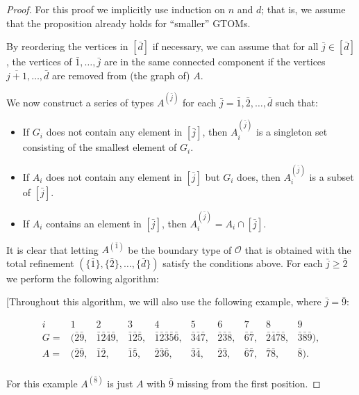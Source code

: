 \documentclass[letterpaper,reqno,11pt]{amsart}
\begin{document}
\begin{proof}
    For this proof we implicitly use induction on $n$ and $d$; that is, we assume that the proposition already holds for ``smaller'' GTOMs.

    By reordering the vertices in $[\bar{d}]$ if necessary, we can assume that for all $\bar{j}\in [\bar{d}]$, the vertices of $\bar{1}, \dots, \bar{j}$ are in the same connected component if the vertices $\overline{j+1}, \dots, \bar{d}$ are removed from (the graph of) $A$.

    We now construct a series of types $A^{(\bar{j})}$ for each $\bar{j} = \bar{1}, \bar{2}, \dots, \bar{d}$ such that: \begin{itemize}
        \item If $G_i$ does not contain any element in $[\bar{j}]$, then $A^{(\bar{j})}_i$ is a singleton set consisting of the smallest element of $G_i$.
        \item If $A_i$ does not contain any element in $[\bar{j}]$ but $G_i$ does, then $A^{(\bar{j})}_i$ is a subset of $[\bar{j}]$.
        \item If $A_i$ contains an element in $[\bar{j}]$, then $A^{(\bar{j})}_i = A_i\cap [\bar{j}]$.
    \end{itemize}

    It is clear that letting $A^{(\bar{1})}$ be the boundary type of $\mathcal{O}$ that is obtained with the total refinement $(\{\bar{1}\}, \{\bar{2}\}, \dots, \{\bar{d}\})$ satisfy the conditions above. For each $\bar{j}\geq \bar{2}$ we perform the following algorithm:

    {\color{gray} [Throughout this algorithm, we will also use the following example, where $\bar{j} = \bar{9}$:
    
    \[\begin{array}{cccccccccc}
        i & 1 & 2 & 3 & 4 & 5 & 6 & 7 & 8 & 9 \\
        G= & (\bar{2}\bar{9}, & \bar{1}\bar{2}\bar{4}\bar{9}, & \bar{1}\bar{2}\bar{5}, & \bar{1}\bar{2}\bar{3}\bar{5}\bar{6}, & \bar{3}\bar{4}\bar{7}, & \bar{2}\bar{3}\bar{8}, & \bar{6}\bar{7}, & \bar{2}\bar{4}\bar{7}\bar{8}, & \bar{3}\bar{8}\bar{9}),\\
        A= & (\bar{2}\bar{9}, & \bar{1}\bar{2}, & \bar{1}\bar{5}, & \bar{2}\bar{3}\bar{6}, & \bar{3}\bar{4}, & \bar{2}\bar{3}, & \bar{6}\bar{7}, & \bar{7}\bar{8}, & \bar{8}).\\
    \end{array}\]

    For this example $A^{(\bar{8})}$ is just $A$ with $\bar{9}$ missing from the first position.
    
}
\end{proof}
\end{document}
